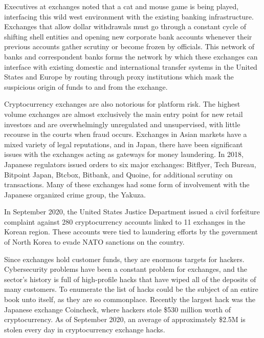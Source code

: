 
Executives at exchanges noted that a cat and mouse game is being played,
interfacing this wild west environment with the existing banking infrastructure.
Exchanges that allow dollar withdrawals must go through a constant cycle of
shifting shell entities and opening new corporate bank accounts whenever their
previous accounts gather scrutiny or become frozen by officials. This network of
banks and correspondent banks forms the network by which these exchanges can
interface with existing domestic and international transfer systems in the
United States and Europe by routing through proxy institutions which mask the
suspicious origin of funds to and from the exchange.

Cryptocurrency exchanges are also notorious for platform risk. The highest
volume exchanges are almost exclusively the main entry point for new retail
investors and are overwhelmingly unregulated and unsupervised, with little
recourse in the courts when fraud occurs. Exchanges in Asian markets have a
mixed variety of legal reputations, and in Japan, there have been significant
issues with the exchanges acting as gateways for money laundering. In 2018,
Japanese regulators issued orders to six major exchanges: Bitflyer, Tech Bureau,
Bitpoint Japan, Btcbox, Bitbank, and Quoine, for additional scrutiny on
transactions. Many of these exchanges had some form of involvement with the
Japanese organized crime group, the Yakuza.


In September 2020, the United States Justice Department issued a civil
forfeiture complaint against 280 cryptocurrency accounts linked to 11 exchanges
in the Korean region. These accounts were tied to laundering efforts by the
government of North Korea to evade NATO sanctions on the country.


Since exchanges hold customer funds, they are enormous targets for hackers.
\cite{stecklow_chaos_2017} Cybersecurity problems have been a constant problem
for exchanges, and the sector's history is full of high-profile hacks that have
wiped all of the deposits of many customers. To enumerate the list of hacks
could be the subject of an entire book unto itself, as they are so commonplace.
Recently the largest hack was the Japanese exchange Coincheck, where hackers
stole \$530 million worth of cryptocurrency. As of September 2020, an average of
approximately \$2.5M is stolen every day in cryptocurrency exchange hacks.

